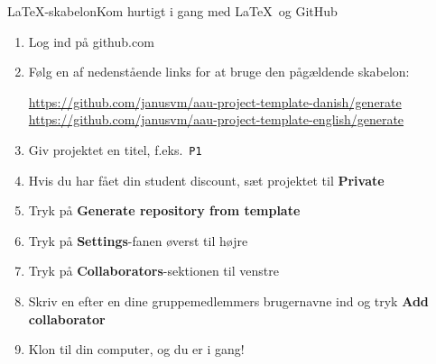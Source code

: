 \documentclass[10pt]{beamer}
\begin{document}
\begin{frame}{\LaTeX-skabelon}{Kom hurtigt i gang med \LaTeX\ og GitHub}
    \begin{enumerate}
    \item Log ind på github.com
    \item Følg en af nedenstående links for at bruge den pågældende skabelon:

      {\footnotesize\url{https://github.com/janusvm/aau-project-template-danish/generate}}
      {\footnotesize\url{https://github.com/janusvm/aau-project-template-english/generate}}

    \item Giv projektet en titel, f.eks.\ \texttt{P1}
    \item Hvis du har fået din student discount, sæt projektet til \textbf{Private}
    \item Tryk på \textbf{Generate repository from template}
    \item Tryk på \textbf{Settings}-fanen øverst til højre
    \item Tryk på \textbf{Collaborators}-sektionen til venstre
    \item Skriv en efter en dine gruppemedlemmers brugernavne ind og tryk \textbf{Add collaborator}
    \item Klon til din computer, og du er i gang!
    \end{enumerate}
\end{frame}
\end{document}
